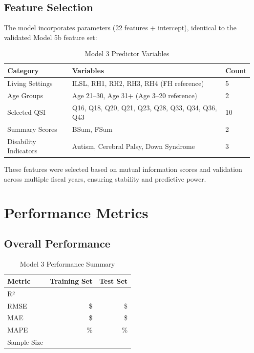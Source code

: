 \subsection{Feature Selection}

The model incorporates \ModelThreeParameters{} parameters (22 features + intercept), identical to the validated Model 5b feature set:

\begin{table}[h]
\centering
\caption{Model 3 Predictor Variables}
\begin{tabular}{lll}
\toprule
\textbf{Category} & \textbf{Variables} & \textbf{Count} \\
\midrule
Living Settings & ILSL, RH1, RH2, RH3, RH4 (FH reference) & 5 \\
Age Groups & Age 21--30, Age 31+ (Age 3--20 reference) & 2 \\
Selected QSI & Q16, Q18, Q20, Q21, Q23, Q28, Q33, Q34, Q36, Q43 & 10 \\
Summary Scores & BSum, FSum & 2 \\
Disability Indicators & Autism, Cerebral Palsy, Down Syndrome & 3 \\
\bottomrule
\end{tabular}
\end{table}

These features were selected based on mutual information scores and validation across multiple fiscal years, ensuring stability and predictive power.

\section{Performance Metrics}

\subsection{Overall Performance}

\begin{table}[h]
\centering
\caption{Model 3 Performance Summary}
\begin{tabular}{lrr}
\toprule
\textbf{Metric} & \textbf{Training Set} & \textbf{Test Set} \\
\midrule
R² & \ModelThreeRSquaredTrain{} & \ModelThreeRSquaredTest{} \\
RMSE & \$\ModelThreeRMSETrain{} & \$\ModelThreeRMSETest{} \\
MAE & \$\ModelThreeMAETrain{} & \$\ModelThreeMAETest{} \\
MAPE & \ModelThreeMAPETrain{}\% & \ModelThreeMAPETest{}\% \\
Sample Size & \ModelThreeTrainingSamples{} & \ModelThreeTestSamples{} \\
\bottomrule
\end{tabular}
\end{table}

